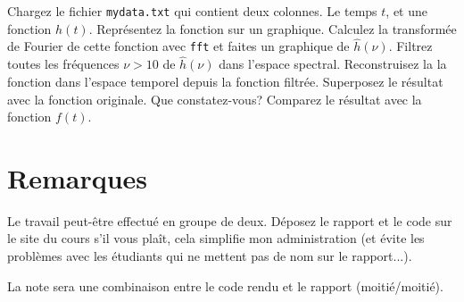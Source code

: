 \documentclass[a4paper,10pt]{article}
\begin{document}
Chargez le fichier \texttt{mydata.txt} qui contient deux colonnes. Le temps $t$, et une fonction $h(t)$. Représentez la fonction sur un graphique.
Calculez la transformée de Fourier de cette fonction avec \texttt{fft} et faites un graphique de $\hat{h}(\nu)$. Filtrez toutes les fréquences $\nu>10$ de $\hat{h}(\nu)$ dans 
l'espace spectral. Reconstruisez la la fonction dans l'espace temporel depuis la fonction filtrée. Superposez
le résultat avec la fonction originale. Que constatez-vous? Comparez le résultat avec la fonction $f(t)$.


\section*{Remarques}

Le travail peut-être effectué en groupe de deux. 
Déposez le rapport et le code sur le site du cours s'il vous plaît, cela simplifie mon administration (et évite les problèmes avec les étudiants qui 
ne mettent pas de nom sur le rapport...).

La note sera une combinaison entre le code rendu et le rapport (moitié/moitié). 
\end{document}
